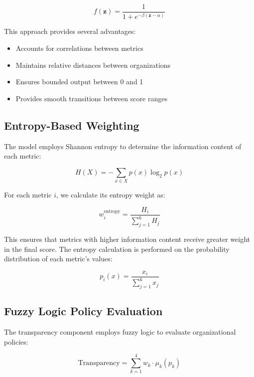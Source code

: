 \documentclass[12pt]{article}
\begin{document}
\begin{equation}
    f(\mathbf{z}) = \frac{1}{1 + e^{-\beta(\mathbf{z} - \alpha)}}
\end{equation}

This approach provides several advantages:
\begin{itemize}
    \item Accounts for correlations between metrics
    \item Maintains relative distances between organizations
    \item Ensures bounded output between 0 and 1
    \item Provides smooth transitions between score ranges
\end{itemize}

\subsection{Entropy-Based Weighting}

The model employs Shannon entropy to determine the information content of each metric:

\begin{equation}
    H(X) = -\sum_{x \in X} p(x) \log_2 p(x)
\end{equation}

For each metric $i$, we calculate its entropy weight as:

\begin{equation}
    w_i^{\text{entropy}} = \frac{H_i}{\sum_{j=1}^{6} H_j}
\end{equation}

This ensures that metrics with higher information content receive greater weight in the final score. The entropy calculation is performed on the probability distribution of each metric's values:

\begin{equation}
    p_i(x) = \frac{x_i}{\sum_{j=1}^{6} x_j}
\end{equation}

\subsection{Fuzzy Logic Policy Evaluation}

The transparency component employs fuzzy logic to evaluate organizational policies:

\begin{equation}
    \text{Transparency} = \sum_{k=1}^{4} w_k \cdot \mu_k(p_k)
\end{equation}
\end{document}
